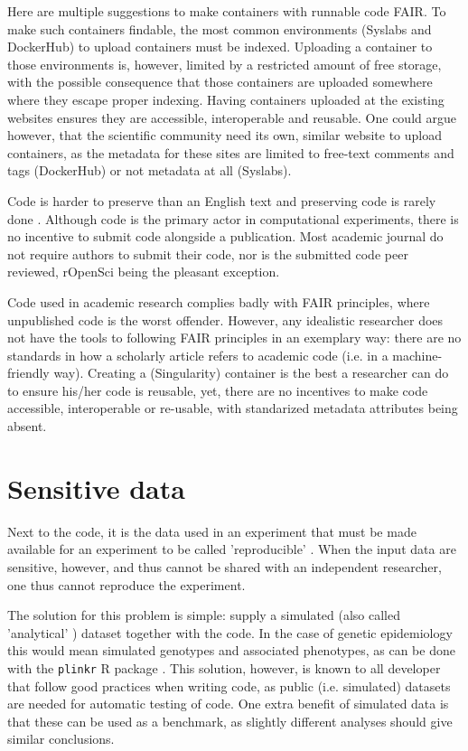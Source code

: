 Here are multiple suggestions to make containers with runnable code FAIR.
To make such containers findable, the most common 
environments (Syslabs and DockerHub) to upload containers must be indexed.
Uploading a container to those environments is, however, limited by
a restricted amount of free storage, with the possible consequence that
those containers are uploaded somewhere where they escape proper indexing.
Having containers uploaded at the existing websites ensures they are
accessible, interoperable and reusable.
One could argue however, that the scientific community need its own,
similar website to upload containers, as the metadata for these
sites are limited to free-text comments and tags (DockerHub)
or not metadata at all (Syslabs).

Code is harder to preserve than an English text
and preserving code is rarely done \cite{barnes2010publish}.
Although code is the primary actor in computational experiments,
there is no incentive to submit code alongside a publication.
Most academic journal do not require authors to submit their code,
nor is the submitted code peer reviewed, 
rOpenSci \cite{ram2018community} being the pleasant exception.

Code used in academic research complies badly with FAIR principles,
where unpublished code is the worst offender.
However, any idealistic researcher does not have the
tools to following FAIR principles in an exemplary way:
there are no standards in how a scholarly article
refers to academic code (i.e. in a machine-friendly way).
Creating a (Singularity) container is the best a researcher
can do to ensure his/her code is reusable,
yet, there are no incentives to make code accessible, interoperable
or re-usable, with standarized metadata attributes being absent.

\section{Sensitive data}\label{sec:sensitive-data}

Next to the code, it is the data used in an experiment 
that must be made available for an experiment 
to be called 'reproducible' \cite{peng2006reproducible}.
When the input data are sensitive, however, and thus cannot be shared with
an independent researcher, one thus cannot reproduce the
experiment.

The solution for this problem is simple:
supply a simulated (also called 'analytical' \cite{peng2006reproducible}) dataset
together with the code.
In the case of genetic epidemiology this would mean
simulated genotypes and associated phenotypes,
as can be done with the \verb|plinkr| R package \cite{plinkr}.
This solution, however, is known to all developer that follow
good practices when writing code, as public (i.e. simulated) 
datasets are needed for automatic testing of code.
One extra benefit of simulated data is that these can be used
as a benchmark, as slightly different analyses should give 
similar conclusions.

